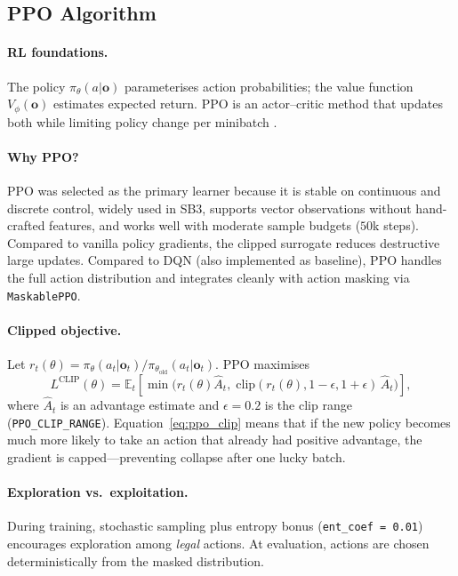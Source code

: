 \subsection{PPO Algorithm}\label{sec:method_ppo}

\paragraph{RL foundations.}
The policy $\pi_\theta(a|\mathbf{o})$ parameterises action probabilities; the value function $V_\phi(\mathbf{o})$ estimates expected return. PPO is an actor--critic method that updates both while limiting policy change per minibatch \cite{schulman_ppo_2017,axak_adaptive_nodate,guzman_developing_2025}.

\paragraph{Why PPO?}
PPO was selected as the primary learner because it is stable on continuous and discrete control, widely used in SB3, supports vector observations without hand-crafted features, and works well with moderate sample budgets ($50$k steps). Compared to vanilla policy gradients, the clipped surrogate reduces destructive large updates. Compared to DQN (also implemented as baseline), PPO handles the full action distribution and integrates cleanly with action masking via \texttt{MaskablePPO}.

\paragraph{Clipped objective.}
Let $r_t(\theta) = \pi_\theta(a_t|\mathbf{o}_t) / \pi_{\theta_{\mathrm{old}}}(a_t|\mathbf{o}_t)$. PPO maximises
\begin{equation}
    L^{\mathrm{CLIP}}(\theta) = \mathbb{E}_t\left[
        \min\bigl(
            r_t(\theta) \hat{A}_t,\;
            \mathrm{clip}(r_t(\theta), 1-\epsilon, 1+\epsilon)\,\hat{A}_t
        \bigr)
    \right],
    \label{eq:ppo_clip}
\end{equation}
where $\hat{A}_t$ is an advantage estimate and $\epsilon = 0.2$ is the clip range (\texttt{PPO\_CLIP\_RANGE}). Equation~\eqref{eq:ppo_clip} means that if the new policy becomes much more likely to take an action that already had positive advantage, the gradient is capped---preventing collapse after one lucky batch.

\paragraph{Exploration vs.\ exploitation.}
During training, stochastic sampling plus entropy bonus (\texttt{ent\_coef = 0.01}) encourages exploration among \emph{legal} actions. At evaluation, actions are chosen deterministically from the masked distribution.

